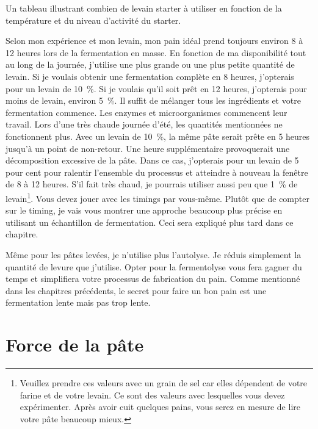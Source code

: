 \begin{table}[!htb]
    \begin{center}
        
        \caption[Quantité de levain]{Un tableau illustrant combien de levain
            starter à utiliser en fonction de la température et du niveau d'activité du starter.}
    \end{center}
\end{table}Selon mon expérience et mon levain, mon pain idéal prend toujours environ 8 à 12 heures lors de la fermentation en masse. En fonction de ma disponibilité tout au long de la journée, j'utilise une plus grande ou une plus petite quantité de levain. Si je voulais obtenir une fermentation complète en 8 heures, j'opterais pour un levain de \qty{10}{\percent}. Si je voulais qu'il soit prêt en 12 heures, j'opterais pour moins de levain, environ \qty{5}{\percent}. Il suffit de mélanger tous les ingrédients et votre fermentation commence. Les enzymes et microorganismes commencent leur travail. Lors d'une très chaude journée d'été, les quantités mentionnées ne fonctionnent plus. Avec un levain de \qty{10}{\percent}, la même pâte serait prête en 5 heures jusqu'à un point de non-retour. Une heure supplémentaire provoquerait une décomposition excessive de la pâte. Dans ce cas, j'opterais pour un levain de 5 pour cent pour ralentir l'ensemble du processus et atteindre à nouveau la fenêtre de 8 à 12 heures. S'il fait très chaud, je pourrais utiliser aussi peu que \qty{1}{\percent} de levain\footnote{Veuillez prendre ces valeurs avec un grain de sel car elles dépendent de votre farine et de votre levain. Ce sont des valeurs avec lesquelles vous devez expérimenter. Après avoir cuit quelques pains, vous serez en mesure de lire votre pâte beaucoup mieux.}. Vous devez jouer avec les timings par vous-même. Plutôt que de compter sur le timing, je vais vous montrer une approche beaucoup plus précise en utilisant un échantillon de fermentation. Ceci sera expliqué plus tard dans ce chapitre.

Même pour les pâtes levées, je n'utilise plus l'autolyse. Je réduis simplement la quantité de levure que j'utilise. Opter pour la fermentolyse vous fera gagner du temps et simplifiera votre processus de fabrication du pain. Comme mentionné dans les chapitres précédents, le secret pour faire un bon pain est une fermentation lente mais pas trop lente.

\section{Force de la pâte}

